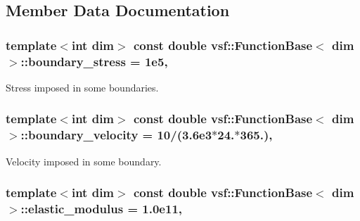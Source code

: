 \subsection{Member Data Documentation}
\hypertarget{classvsf_1_1FunctionBase_a342cfaf03d11de71ca34234f48e8825e}{
\subsubsection[{boundary\-\_\-stress}]{\setlength{\rightskip}{0pt plus 5cm}template$<$int dim$>$ const double {\bf vsf\-::\-Function\-Base}$<$ dim $>$\-::boundary\-\_\-stress = 1e5\hspace{0.3cm}{\ttfamily [static]}, {\ttfamily [protected]}}}\label{classvsf_1_1FunctionBase_a342cfaf03d11de71ca34234f48e8825e}
Stress imposed in some boundaries. \hypertarget{classvsf_1_1FunctionBase_ae2bc27d347d942067f178bb02006ec44}{
\subsubsection[{boundary\-\_\-velocity}]{\setlength{\rightskip}{0pt plus 5cm}template$<$int dim$>$ const double {\bf vsf\-::\-Function\-Base}$<$ dim $>$\-::boundary\-\_\-velocity = 10/(3.\-6e3$\ast$24.$\ast$365.)\hspace{0.3cm}{\ttfamily [static]}, {\ttfamily [protected]}}}\label{classvsf_1_1FunctionBase_ae2bc27d347d942067f178bb02006ec44}
Velocity imposed in some boundary. \hypertarget{classvsf_1_1FunctionBase_a4c09329f553545abcaaac65ab1913903}{
\subsubsection[{elastic\-\_\-modulus}]{\setlength{\rightskip}{0pt plus 5cm}template$<$int dim$>$ const double {\bf vsf\-::\-Function\-Base}$<$ dim $>$\-::elastic\-\_\-modulus = 1.\-0e11\hspace{0.3cm}{\ttfamily [static]}, {\ttfamily [protected]}}}\label{classvsf_1_1FunctionBase_a4c09329f553545abcaaac65ab1913903}
